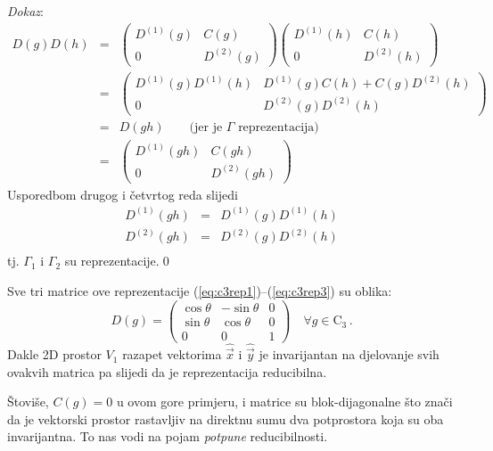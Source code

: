 \emph{Dokaz}:
\begin{eqnarray*}
D(g)D(h)&=&
\begin{pmatrix}
 D^{(1)}(g) & C(g) \\ 0 & D^{(2)}(g)
\end{pmatrix}
\begin{pmatrix}
 D^{(1)}(h) & C(h) \\ 0 & D^{(2)}(h)
\end{pmatrix}  \\[1ex]
&=&
\begin{pmatrix}
  D^{(1)}(g)D^{(1)}(h) &  D^{(1)}(g)C(h)+C(g)D^{(2)}(h) \\
       0               &   D^{(2)}(g)D^{(2)}(h)  
   \end{pmatrix}  \\[1ex]
&=& D(gh) \qquad \textrm{(jer je $\Gamma$ reprezentacija)}  \\[1ex]
&=& 
\begin{pmatrix}
 D^{(1)}(gh) & C(gh) \\ 0 & D^{(2)}(gh)
\end{pmatrix}
\end{eqnarray*}
Usporedbom drugog i četvrtog reda slijedi
\begin{eqnarray*}
D^{(1)}(gh) &=& D^{(1)}(g)D^{(1)}(h) \\
D^{(2)}(gh) &=& D^{(2)}(g)D^{(2)}(h) \\
\end{eqnarray*}
tj. $\Gamma_1$ i $\Gamma_2$ su reprezentacije.\qed

\begin{primjer}

Sve tri matrice ove reprezentacije (\ref{eq:c3rep1})--(\ref{eq:c3rep3}) su oblika:
\begin{displaymath}
 D(g)= 
\begin{pmatrix}
 \cos\theta & -\sin\theta & 0 \\
 \sin\theta& \cos\theta & 0 \\
    0 & 0 & 1 
\end{pmatrix}
\quad \forall g \in \textrm{C}_3 \,.
\end{displaymath}
Dakle 2D prostor $V_1$ razapet vektorima $\hat{\vec{x}}$ i $\hat{\vec{y}}$
je invarijantan na djelovanje svih ovakvih matrica
pa slijedi da je reprezentacija reducibilna.
\end{primjer}

Štoviše, $C(g)=0$ u ovom gore primjeru, i matrice su
blok-dijagonalne što znači da je vektorski prostor
rastavljiv na direktnu sumu dva potprostora koja su oba
invarijantna. To nas vodi na pojam \emph{potpune} reducibilnosti.

